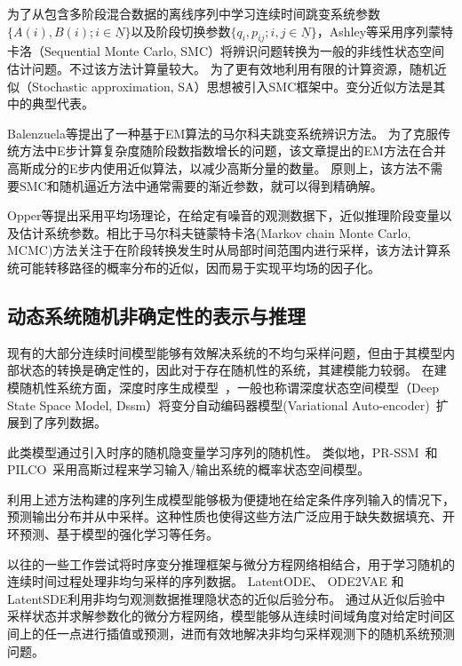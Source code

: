 为了从包含多阶段混合数据的离线序列中学习连续时间跳变系统参数$\{A(i),B(i);i \in \underline{N}\}$以及阶段切换参数$\{q_i,p_{ij};i,j \in \underline{N}\}$，Ashley等采用序列蒙特卡洛（Sequential Monte Carlo, SMC）\cite{ashley2014sequential}将辨识问题转换为一般的非线性状态空间估计问题。不过该方法计算量较大。
为了更有效地利用有限的计算资源，随机近似（Stochastic approximation, SA）\cite{svensson2014identification}思想被引入SMC框架中。变分近似方法\cite{opper2007variational}是其中的典型代表。

Balenzuela等提出了一种基于EM算法的马尔科夫跳变系统辨识方法\cite{balenzuela2022parameter}。
为了克服传统方法中E步计算复杂度随阶段数指数增长的问题，该文章提出的EM方法在合并高斯成分的E步内使用近似算法，以减少高斯分量的数量。
原则上，该方法不需要SMC和随机逼近方法中通常需要的渐近参数，就可以得到精确解。

Opper等\cite{opper2007variational}提出采用平均场理论，在给定有噪音的观测数据下，近似推理阶段变量以及估计系统参数。相比于马尔科夫链蒙特卡洛(Markov chain Monte Carlo, MCMC)方法关注于在阶段转换发生时从局部时间范围内进行采样，该方法计算系统可能转移路径的概率分布的近似，因而易于实现平均场的因子化。

\subsection{动态系统随机非确定性的表示与推理}
现有的大部分连续时间模型能够有效解决系统的不均匀采样问题，但由于其模型内部状态的转换是确定性的，因此对于存在随机性的系统，其建模能力较弱。
在建模随机性系统方面，深度时序生成模型~\cite{Fraccaro2016,Chung2015,Karl2017}，一般也称谓深度状态空间模型（Deep State Space Model, Dssm）将变分自动编码器模型(Variational Auto-encoder)~\cite{kingma2013auto}扩展到了序列数据。

此类模型通过引入时序的随机隐变量学习序列的随机性。
类似地，PR-SSM~\cite{doerr2018probabilistic}和PILCO~\cite{deisenroth2011pilco}采用高斯过程来学习输入/输出系统的概率状态空间模型。

利用上述方法构建的序列生成模型能够极为便捷地在给定条件序列输入的情况下，预测输出分布并从中采样。这种性质也使得这些方法广泛应用于缺失数据填充\cite{Fraccaro2017}、开环预测\cite{Hafner2019}、基于模型的强化学习等任务\cite{Hafner2019}。

以往的一些工作尝试将时序变分推理框架与微分方程网络相结合，用于学习随机的连续时间过程处理非均匀采样的序列数据。
LatentODE\cite{Rubanova2019}、 ODE2VAE\cite{Yildiz2019} 和 LatentSDE\cite{Li2020}利用非均匀观测数据推理隐状态的近似后验分布。
通过从近似后验中采样状态并求解参数化的微分方程网络，模型能够从连续时间域角度对给定时间区间上的任一点进行插值或预测，进而有效地解决非均匀采样观测下的随机系统预测问题。


